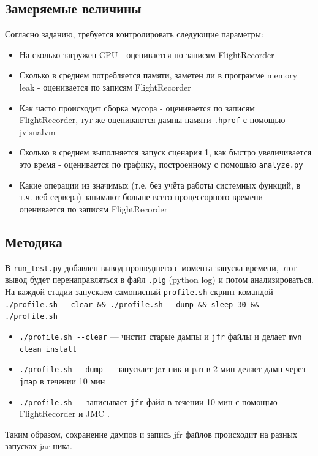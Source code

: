 \documentclass{article}
\begin{document}
	\newpage
	\subsection*{Замеряемые величины}
	Согласно заданию, требуется контролировать следующие параметры:
		\begin{itemize}
			\item На сколько загружен CPU - оценивается по записям FlightRecorder
			\item Сколько в среднем потребляется памяти, заметен ли в программе memory leak - оценивается по записям FlightRecorder
			\item Как часто происходит сборка мусора - оценивается по записям FlightRecorder, тут же оцениваются дампы памяти \texttt{.hprof} с помощью jvisualvm
			\item Сколько в среднем выполняется запуск сценария 1, как быстро увеличивается это время - оценивается по графику, построенному с помошью \texttt{analyze.py} 
			\item Какие операции из значимых (т.е. без учёта работы системных функций, в т.ч. веб сервера) занимают больше всего процессорного времени - оценивается по записям FlightRecorder
		\end{itemize}
	
	\subsection*{Методика}
	В \texttt{run\_test.py} добавлен вывод прошедшего с момента запуска времени, этот вывод будет перенаправляться в файл \texttt{.plg} (python log) и потом анализироваться.
	На каждой стадии запускаем самописный \texttt{profile.sh} скрипт командой
	\texttt{./profile.sh -{}-clear \&\& ./profile.sh -{}-dump \&\& sleep 30 \&\& ./profile.sh}

		\begin{itemize}
			\item \texttt{./profile.sh -{}-clear} --- чистит старые дампы и \texttt{jfr} файлы и делает \texttt{mvn clean install}
			\item \texttt{./profile.sh -{}-dump} --- запускает jar-ник и раз в 2 мин делает дамп через \texttt{jmap} в течении 10 мин
			\item \texttt{./profile.sh} --- записывает \texttt{jfr} файл в течении 10 мин с помощью FlightRecorder и JMC .
		\end{itemize}

	Таким образом, сохранение дампов и запись jfr файлов происходит на разных запусках jar-ника.
\end{document}
